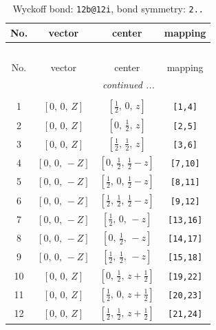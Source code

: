 \documentclass[fleqn,8pt]{jsarticle}
\begin{document}
\renewcommand{\arraystretch}{1.2}
\begin{longtable}{cccc}
\caption{Wyckoff bond: {\tt 12b@12i}, bond symmetry: {\tt 2..}}
 \\
 \hline \hline
No. & vector & center & mapping \\ \hline \endfirsthead

\multicolumn{3}{l}{\tablename\ \thetable{}} \\
 \hline \hline
No. & vector & center & mapping \\ \hline \endhead

 \hline \hline
\multicolumn{3}{r}{\footnotesize\it continued ...} \\ \endfoot

 \hline \hline
\multicolumn{3}{r}{} \\ \endlastfoot

1 & $\left[ 0,\, 0,\, Z \right]$ & $\left[ \frac{1}{2},\, 0,\, z \right]$ & {\tt [1,4]} \\ \hline
2 & $\left[ 0,\, 0,\, Z \right]$ & $\left[ 0,\, \frac{1}{2},\, z \right]$ & {\tt [2,5]} \\ \hline
3 & $\left[ 0,\, 0,\, Z \right]$ & $\left[ \frac{1}{2},\, \frac{1}{2},\, z \right]$ & {\tt [3,6]} \\ \hline
4 & $\left[ 0,\, 0,\, - Z \right]$ & $\left[ 0,\, \frac{1}{2},\, \frac{1}{2} - z \right]$ & {\tt [7,10]} \\ \hline
5 & $\left[ 0,\, 0,\, - Z \right]$ & $\left[ \frac{1}{2},\, 0,\, \frac{1}{2} - z \right]$ & {\tt [8,11]} \\ \hline
6 & $\left[ 0,\, 0,\, - Z \right]$ & $\left[ \frac{1}{2},\, \frac{1}{2},\, \frac{1}{2} - z \right]$ & {\tt [9,12]} \\ \hline
7 & $\left[ 0,\, 0,\, - Z \right]$ & $\left[ \frac{1}{2},\, 0,\, - z \right]$ & {\tt [13,16]} \\ \hline
8 & $\left[ 0,\, 0,\, - Z \right]$ & $\left[ 0,\, \frac{1}{2},\, - z \right]$ & {\tt [14,17]} \\ \hline
9 & $\left[ 0,\, 0,\, - Z \right]$ & $\left[ \frac{1}{2},\, \frac{1}{2},\, - z \right]$ & {\tt [15,18]} \\ \hline
10 & $\left[ 0,\, 0,\, Z \right]$ & $\left[ 0,\, \frac{1}{2},\, z + \frac{1}{2} \right]$ & {\tt [19,22]} \\ \hline
11 & $\left[ 0,\, 0,\, Z \right]$ & $\left[ \frac{1}{2},\, 0,\, z + \frac{1}{2} \right]$ & {\tt [20,23]} \\ \hline
12 & $\left[ 0,\, 0,\, Z \right]$ & $\left[ \frac{1}{2},\, \frac{1}{2},\, z + \frac{1}{2} \right]$ & {\tt [21,24]} \\
\end{longtable}
\end{document}
